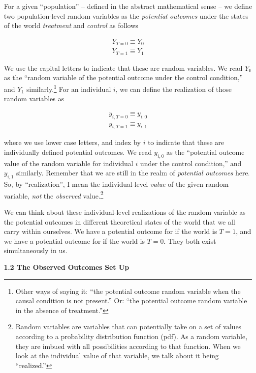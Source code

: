 \documentclass[11pt]{article}
\begin{document}
For a given ``population'' -- defined in the abstract mathematical sense -- we define two population-level random variables as the \emph{potential outcomes} under the states of the world \emph{treatment} and \emph{control} as follows

\begin{align*}
  Y_{T=0} \equiv Y_{0}\\
  Y_{T=1} \equiv Y_{1}
\end{align*}

We use the capital letters to indicate that these are random variables.  We read $Y_{0}$ as the ``random variable of the potential outcome under the control condition,'' and $Y_{1}$ similarly.\footnote{Other ways of saying it: ``the potential outcome random variable when the causal condition is not present.''  Or: ``the potential outcome random variable in the absence of treatment.''} For an individual $i$, we can define the realization of those random variables as

\begin{align*}
  y_{i,T=0} \equiv y_{i,0}\\
  y_{i,T=1} \equiv y_{i,1}
\end{align*}

where we use lower case letters, and index by $i$ to indicate that these are individually defined potential outcomes. We read $y_{i,0}$ as the ``potential outcome value of the random variable for individual $i$ under the control condition,'' and $y_{i,1}$ similarly.  Remember that we are still in the realm of \emph{potential outcomes} here.  So, by ``realization'', I mean the individual-level \emph{value} of the given random variable, \emph{not} the \emph{observed} value.\footnote{Random variables are variables that can potentially take on a set of values according to a probability distribution function (pdf).  As a random variable, they are imbued with all possibilities according to that function.  When we look at the individual value of that variable, we talk about it being ``realized.''}

We can think about these individual-level realizations of the random variable as the potential outcomes in different theoretical states of the world that we all carry within ourselves.  We have a potential outcome for if the world is $T=1$, and we have a potential outcome for if the world is $T=0$.  They both exist simultaneously in us.

\vspace{.2in}
\large{\textbf{1.2 The Observed Outcomes Set Up}} \\
\end{document}
